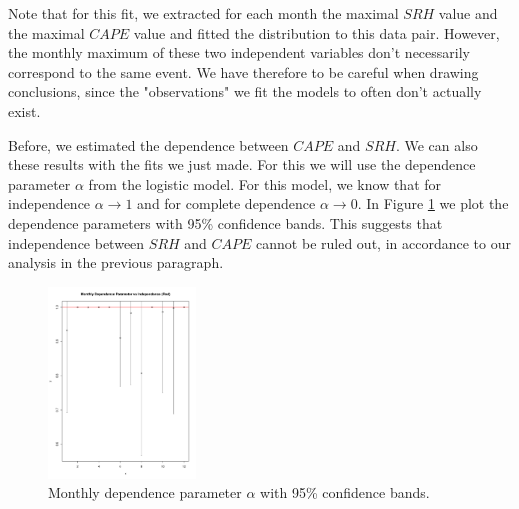 \documentclass[10pt,conference,compsocconf]{IEEEtran}
\begin{document}
Note that for this fit, we extracted for each month the maximal $SRH$ value and the maximal $CAPE$ value and fitted the distribution to this data pair. However, the monthly maximum of these two independent variables don't necessarily correspond to the same event. We have therefore to be careful when drawing conclusions, since the "observations" we fit the models to often don't actually exist.
\par
Before, we estimated the dependence between $CAPE$ and $SRH$. We can also these results with the fits we just made. For this we will use the dependence parameter $\alpha$ from the logistic model. For this model, we know that for independence $\alpha \to 1$ and for complete dependence $\alpha \to 0$. In Figure \ref{fig:cape_srh_dependance_logistic} we plot the dependence parameters with 95\% confidence bands. This suggests that independence between $SRH$ and $CAPE$ cannot be ruled out, in accordance to our analysis in the previous paragraph.

\begin{figure}
	\centering
	\includegraphics[width=0.35\textwidth]{../plots/dependance_parameter_cape_srh_logistic.pdf}
	\caption{Monthly dependence parameter $\alpha$ with 95\% confidence bands.}
	\label{fig:cape_srh_dependance_logistic}
\end{figure}
\end{document}
